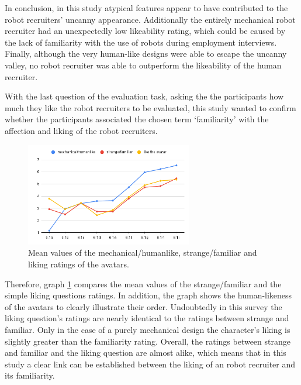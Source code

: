 In conclusion, in this study atypical features appear to have contributed to the robot recruiters' uncanny appearance. Additionally the entirely mechanical robot recruiter had an unexpectedly low likeability rating, which could be caused by the lack of familiarity with the use of robots during employment interviews. Finally, although the very human-like designs were able to escape the uncanny valley, no robot recruiter was able to outperform the likeability of the human recruiter.\par
With the last question of the evaluation task, asking the the participants how much they like the robot recruiters to be evaluated, this study wanted to confirm whether the participants associated the chosen term `familiarity' with the affection and liking of the robot recruiters. 
\begin{figure} %
    \centering
    \includegraphics[width=0.65\textwidth]{graphics/result/result4.png}
    \caption{Mean values of the mechanical/humanlike, strange/familiar and liking ratings of the avatars.}
    \label{fig:likeability}
\end{figure}
Therefore, graph \ref{fig:likeability} compares the mean values of the strange/familiar and the simple liking questions ratings. In addition, the graph shows the human-likeness of the avatars to clearly illustrate their order. Undoubtedly in this survey the liking question's ratings are nearly identical to the ratings between strange and familiar. Only in the case of a purely mechanical design the character's liking is slightly greater than the familiarity rating. Overall, the ratings between strange and familiar and the liking question are almost alike, which means that in this study a clear link can be established between the liking of an robot recruiter and its familiarity.\\
